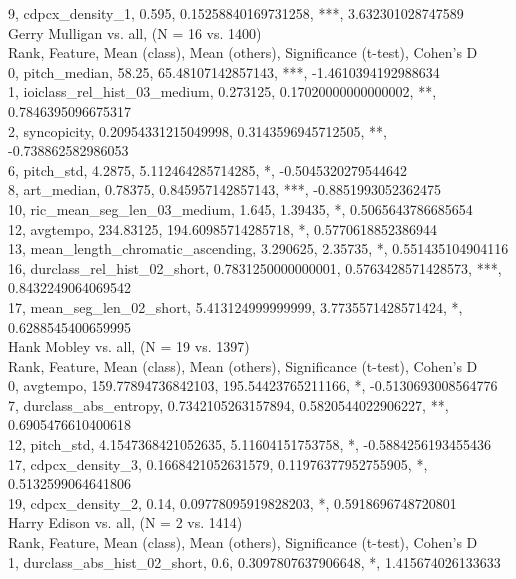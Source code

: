 9, cdpcx_density_1, 0.595, 0.15258840169731258, ***, 3.632301028747589\\
Gerry Mulligan vs. all, (N = 16 vs. 1400)\\
Rank, Feature, Mean (class), Mean (others), Significance (t-test), Cohen's D\\
0, pitch_median, 58.25, 65.48107142857143, ***, -1.4610394192988634\\
1, ioiclass_rel_hist_03_medium, 0.273125, 0.17020000000000002, **, 0.7846395096675317\\
2, syncopicity, 0.20954331215049998, 0.3143596945712505, **, -0.738862582986053\\
6, pitch_std, 4.2875, 5.112464285714285, *, -0.5045320279544642\\
8, art_median, 0.78375, 0.845957142857143, ***, -0.8851993052362475\\
10, ric_mean_seg_len_03_medium, 1.645, 1.39435, *, 0.5065643786685654\\
12, avgtempo, 234.83125, 194.60985714285718, *, 0.5770618852386944\\
13, mean_length_chromatic_ascending, 3.290625, 2.35735, *, 0.551435104904116\\
16, durclass_rel_hist_02_short, 0.7831250000000001, 0.5763428571428573, ***, 0.8432249064069542\\
17, mean_seg_len_02_short, 5.413124999999999, 3.7735571428571424, *, 0.6288545400659995\\
Hank Mobley vs. all, (N = 19 vs. 1397)\\
Rank, Feature, Mean (class), Mean (others), Significance (t-test), Cohen's D\\
0, avgtempo, 159.77894736842103, 195.54423765211166, *, -0.5130693008564776\\
7, durclass_abs_entropy, 0.7342105263157894, 0.5820544022906227, **, 0.6905476610400618\\
12, pitch_std, 4.1547368421052635, 5.11604151753758, *, -0.5884256193455436\\
17, cdpcx_density_3, 0.1668421052631579, 0.11976377952755905, *, 0.5132599064641806\\
19, cdpcx_density_2, 0.14, 0.09778095919828203, *, 0.5918696748720801\\
Harry Edison vs. all, (N = 2 vs. 1414)\\
Rank, Feature, Mean (class), Mean (others), Significance (t-test), Cohen's D\\
1, durclass_abs_hist_02_short, 0.6, 0.3097807637906648, *, 1.415674026133633\\
